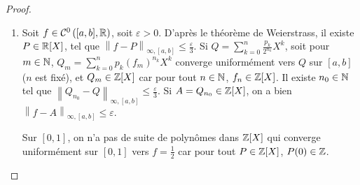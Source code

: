 \begin{proof}
\begin{enumerate}
        \item Soit $f\in\mathcal{C}^{0}\left([a,b],\mathbb{R}\right)$, soit $\varepsilon>0$. D'après le théorème de Weierstrass, il existe $P\in\mathbb{R}[X]$, tel que $\left\lVert f-P\right\rVert_{\infty,[a,b]}\leqslant\frac{\varepsilon}{3}$. Si $Q=\sum_{k=0}^{n}\frac{p_{k}}{2^{n_{k}}}X^{k}$, soit pour $m\in\mathbb{N}$, $Q_{m}=\sum_{k=0}^{n}p_{k}\left(f_{m}\right)^{n_{k}}X^{k}$ converge uniformément vers $Q$ sur $[a,b]$ ($n$ est fixé), et $Q_{m}\in\mathbb{Z}[X]$ car pour tout $n\in\mathbb{N}$, $f_{n}\in\mathbb{Z}[X]$.
        Il existe $n_{0}\in\mathbb{N}$ tel que $\left\lVert Q_{n_{0}}-Q\right\rVert_{\infty,[a,b]}\leqslant\frac{\varepsilon}{3}$. Si $A=Q_{n_{0}}\in\mathbb{Z}[X]$, on a bien $\left\lVert f-A\right\rVert_{\infty,[a,b]}\leqslant\varepsilon$.

        Sur $[0,1]$, on n'a pas de suite de polynômes dans $\mathbb{Z}[X]$ qui converge uniformément sur $[0,1]$ vers $f=\frac{1}{2}$ car pour tout $P\in\mathbb{Z}[X]$, $P(0)\in\mathbb{Z}$.
    \end{enumerate}
\end{proof}

